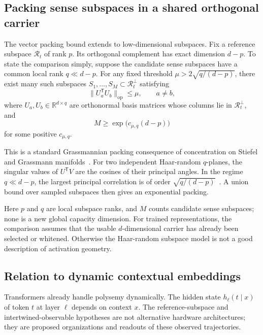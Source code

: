 \documentclass[
  aps,
  reprint,
  superscriptaddress,
  floatfix,
  nofootinbib,
  longbibliography
]{revtex4-2}
\newcommand{\R}{\mathbb{R}}
\newcommand{\T}{^{\mathsf{T}}}
\newcommand{\opnorm}[1]{\lVert #1 \rVert_{\mathrm{op}}}
\begin{document}
\subsection{Packing sense subspaces in a shared orthogonal carrier}
\label{sec:grassmann}

The vector packing bound extends to low-dimensional subspaces.  Fix a
reference subspace $\mathcal R_t$ of rank $p$.  Its orthogonal complement has
exact dimension $d-p$.  To state the comparison simply, suppose the candidate
sense subspaces have a common local rank $q\ll d-p$.  For any fixed threshold
$\mu>2\sqrt{q/(d-p)}$, there exist many such subspaces
$S_1,\dots,S_M\subset\mathcal R_t^\perp$ satisfying
%
\begin{equation}
\label{eq:grassmann-coherence}
\opnorm{U_a\T U_b}\le \mu,\qquad a\neq b,
\end{equation}
%
where $U_a,U_b\in\R^{d\times q}$ are orthonormal basis matrices whose columns
lie in $\mathcal R_t^\perp$, and
%
\begin{equation}
\label{eq:grassmann-count}
M\ge \exp\!\bigl(c_{\mu,q}(d-p)\bigr)
\end{equation}
%
for some positive $c_{\mu,q}$.

This is a standard Grassmannian packing consequence of concentration on
Stiefel and Grassmann manifolds~\cite{szarek1982nets,conway1996packings}.
For two independent Haar-random $q$-planes, the singular values of $U\T V$
are the cosines of their principal angles. In the regime $q\ll d-p$, the
largest principal correlation is of order
$\sqrt{q/(d-p)}$~\cite{chikuse2003statistics,absil2006condition,edelman1998random}.
A union bound over sampled subspaces then gives an exponential packing.

Here $p$ and $q$ are local subspace ranks, and $M$ counts candidate sense
subspaces; none is a new global capacity dimension.  For trained
representations, the comparison assumes that the usable $d$-dimensional
carrier has already been selected or whitened.  Otherwise the Haar-random
subspace model is not a good description of activation geometry.

\subsection{Relation to dynamic contextual embeddings}
\label{sec:dynamic}

Transformers already handle polysemy dynamically. The hidden state
$h_\ell(t\mid x)$ of token $t$ at layer $\ell$ depends on context $x$.
The reference-subspace and intertwined-observable hypotheses are not
alternative hardware architectures; they are proposed organizations and
readouts of these observed trajectories.
\end{document}
